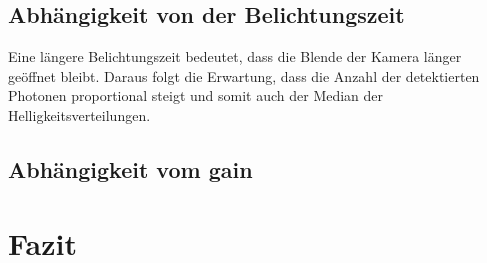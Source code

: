 \subsection{Abhängigkeit von der Belichtungszeit}
Eine längere Belichtungszeit bedeutet, dass die Blende der Kamera länger geöffnet bleibt. Daraus folgt die Erwartung, dass die Anzahl der detektierten Photonen proportional steigt und somit auch der Median der Helligkeitsverteilungen.

\subsection{Abhängigkeit vom gain}

\section{Fazit}